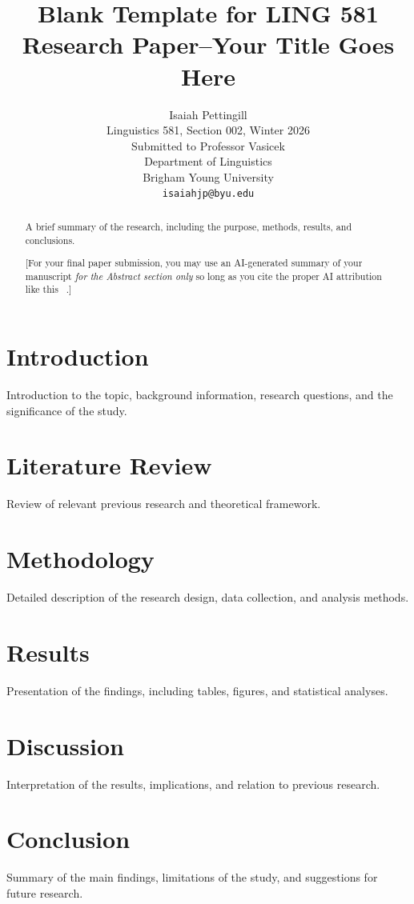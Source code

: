 \documentclass[11pt,table,xcdraw]{article}
\title{Blank Template for LING 581 Research Paper--Your Title Goes Here}
\author{Isaiah Pettingill \\
  Linguistics 581, Section 002, Winter 2026 \\
  Submitted to Professor Vasicek \\
  Department of Linguistics \\
  Brigham Young University \\
  {\tt isaiahjp@byu.edu} }
\begin{document}
\maketitle

\begin{abstract}
A brief summary of the research, including the purpose, methods, results, and conclusions.

[For your final paper submission, you may use an AI-generated summary of your manuscript \textit{for the Abstract section only} so long as you cite the proper AI attribution like this ~\cite{chatgpt}.]
\end{abstract}

\section{Introduction}
Introduction to the topic, background information, research questions, and the significance of the study.

\section{Literature Review}
Review of relevant previous research and theoretical framework.

\section{Methodology}
Detailed description of the research design, data collection, and analysis methods.

\section{Results}
Presentation of the findings, including tables, figures, and statistical analyses.

\section{Discussion}
Interpretation of the results, implications, and relation to previous research.

\section{Conclusion}
Summary of the main findings, limitations of the study, and suggestions for future research.



\end{document}
